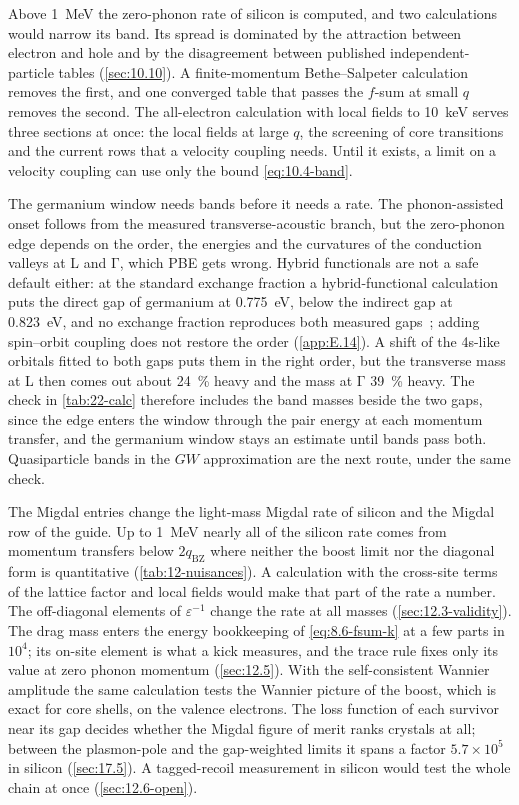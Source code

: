 Above \SI{1}{MeV} the zero-phonon rate of silicon is computed, and two calculations would narrow its band. Its spread is dominated by the attraction between electron and hole and by the disagreement between published independent-particle tables (\cref{sec:10.10}). A finite-momentum Bethe--Salpeter calculation removes the first, and one converged table that passes the $f$-sum at small $q$ removes the second. The all-electron calculation with local fields to \SI{10}{keV} serves three sections at once: the local fields at large $q$, the screening of core transitions and the current rows that a velocity coupling needs. Until it exists, a limit on a velocity coupling can use only the bound \cref{eq:10.4-band}.

The germanium window needs bands before it needs a rate. The phonon-assisted onset follows from the measured transverse-acoustic branch, but the zero-phonon edge depends on the order, the energies and the curvatures of the conduction valleys at L and $\mathrm{\Gamma}$, which PBE gets wrong. Hybrid functionals are not a safe default either: at the standard exchange fraction a hybrid-functional calculation puts the direct gap of germanium at \SI{0.775}{eV}, below the indirect gap at \SI{0.823}{eV}, and no exchange fraction reproduces both measured gaps~\cite[Fig.~1(a)]{abdurrazaq2025accurate}; adding spin--orbit coupling does not restore the order (\cref{app:E.14}). A shift of the 4s-like orbitals fitted to both gaps puts them in the right order, but the transverse mass at L then comes out about \SI{24}{\percent} heavy and the mass at $\mathrm{\Gamma}$ \SI{39}{\percent} heavy. The check in \cref{tab:22-calc} therefore includes the band masses beside the two gaps, since the edge enters the window through the pair energy at each momentum transfer, and the germanium window stays an estimate until bands pass both. Quasiparticle bands in the $GW$ approximation are the next route, under the same check.

The Migdal entries change the light-mass Migdal rate of silicon and the Migdal row of the guide. Up to \SI{1}{MeV} nearly all of the silicon rate comes from momentum transfers below $2q_{\mathrm{BZ}}$ where neither the boost limit nor the diagonal form is quantitative (\cref{tab:12-nuisances}). A calculation with the cross-site terms of the lattice factor and local fields would make that part of the rate a number. The off-diagonal elements of $\varepsilon^{-1}$ change the rate at all masses (\cref{sec:12.3-validity}). The drag mass enters the energy bookkeeping of \cref{eq:8.6-fsum-k} at a few parts in $10^4$; its on-site element is what a kick measures, and the trace rule fixes only its value at zero phonon momentum (\cref{sec:12.5}). With the self-consistent Wannier amplitude the same calculation tests the Wannier picture of the boost, which is exact for core shells, on the valence electrons. The loss function of each survivor near its gap decides whether the Migdal figure of merit ranks crystals at all; between the plasmon-pole and the gap-weighted limits it spans a factor $5.7\times10^5$ in silicon (\cref{sec:17.5}). A tagged-recoil measurement in silicon would test the whole chain at once (\cref{sec:12.6-open}).

